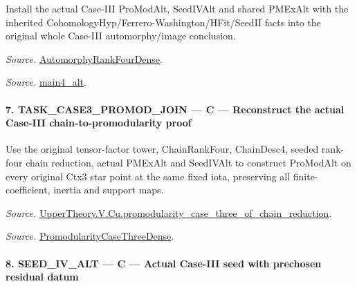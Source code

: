Install the actual Case-III ProModAlt, SeedIVAlt and shared PMExAlt with the inherited CohomologyHyp/Ferrero-Washington/HFit/SeedII facts into the original whole Case-III automorphy/image conclusion.

\emph{Source.} \href{https://github.com/CocoSgt/riemann-hypothesis-lean/blob/7cbf7a0c32fca1badf05931879a37c3f8a2b03b4/src/Development/AutomorphicArithmetic/AutomorphicVarieties/ModularityArgument/ThresholdArguments/DenseThresholdCases/PromodularityCaseThree.lean#L43-L44}{AutomorphyRankFourDense}.

\emph{Source.} \href{https://github.com/CocoSgt/riemann-hypothesis-lean/blob/7cbf7a0c32fca1badf05931879a37c3f8a2b03b4/src/Development/AutomorphicArithmetic/AutomorphicVarieties/ModularityArgument/ThresholdArguments/DenseThresholdCases/CuFinal.lean#L44-L44}{main4\_\allowbreak alt}.



\paragraph{7. TASK\_\allowbreak CASE3\_\allowbreak PROMOD\_\allowbreak JOIN — C — Reconstruct the actual Case-III chain-to-promodularity proof}

Use the original tensor-factor tower, ChainRankFour, ChainDesc4, seeded rank-four chain reduction, actual PMExAlt and SeedIVAlt to construct ProModAlt on every original Ctx3 star point at the same fixed iota, preserving all finite-coefficient, inertia and support maps.

\emph{Source.} \href{https://github.com/CocoSgt/riemann-hypothesis-lean/blob/7cbf7a0c32fca1badf05931879a37c3f8a2b03b4/src/Development/AutomorphicArithmetic/AutomorphicVarieties/ModularityArgument/ThresholdArguments/DenseThresholdCases/PromodularityCaseThreeOfLemmas.lean#L131-L153}{UpperTheory.V.Cu.promodularity\_\allowbreak case\_\allowbreak three\_\allowbreak of\_\allowbreak chain\_\allowbreak reduction}.

\emph{Source.} \href{https://github.com/CocoSgt/riemann-hypothesis-lean/blob/7cbf7a0c32fca1badf05931879a37c3f8a2b03b4/src/Development/AutomorphicArithmetic/AutomorphicVarieties/ModularityArgument/ThresholdArguments/DenseThresholdCases/PromodularityCaseThree.lean#L40-L42}{PromodularityCaseThreeDense}.



\paragraph{8. SEED\_\allowbreak IV\_\allowbreak ALT — C — Actual Case-III seed with prechosen residual datum}

